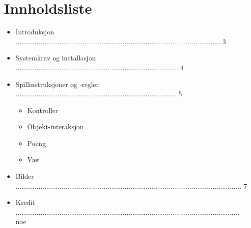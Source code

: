 \documentclass[paper=a4]{article}
\begin{document}
\section{Innholdsliste}
\begin{itemize}
	\item Introduksjon ........................................................................................................... 3
	\item Systemkrav og installasjon ..................................................................................... 4
	\item Spillinstruksjoner og -regler .................................................................................... 5
		\begin{itemize} 
			\item Kontroller
			\item Objekt-interaksjon
			\item Poeng
			\item Vær
		\end{itemize}
	\item Bilder ...................................................................................................................... 7
	\item Kredit ..................................................................................................................... noe
\end{itemize}
\newpage
\end{document}
